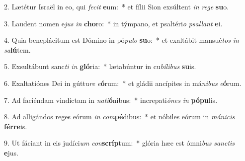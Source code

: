 2. Lætétur Israël in eo, qui \textit{fe}\textit{cit} \textbf{e}um:~*  et fílii Sion exsúltent \textit{in} \textit{re}\textit{ge} \textbf{su}o.\

3. Laudent nomen e\textit{jus} \textit{in} \textbf{cho}ro:~*  in týmpano, et psaltéri\textit{o} \textit{psal}\textit{lant} \textbf{e}i.\

4. Quia beneplácitum est Dómino in pó\textit{pu}\textit{lo} \textbf{su}o:~*  et exaltábit mansué\textit{tos} \textit{in} \textit{sa}\textbf{lú}tem.\

5. Exsultábunt sanc\textit{ti} \textit{in} \textbf{gló}ria:~*  lætabúntur in cu\textit{bí}\textit{li}\textit{bus} \textbf{su}is.\

6. Exaltatiónes Dei in gúttu\textit{re} \textit{e}\textbf{ó}rum:~*  et gládii ancípites in má\textit{ni}\textit{bus} \textit{e}\textbf{ó}rum.\

7. Ad faciéndam vindíctam in \textit{na}\textit{ti}\textbf{ó}nibus:~*  increpati\textit{ó}\textit{nes} \textit{in} \textbf{pó}\textbf{pu}lis.\

8. Ad alligándos reges eórum \textit{in} \textit{com}\textbf{pé}dibus:~*  et nóbiles eórum in \textit{má}\textit{ni}\textit{cis} \textbf{fér}\textbf{re}is.\

9. Ut fáciant in eis judíci\textit{um} \textit{con}\textbf{scríp}tum:~*  glória hæc est ómni\textit{bus} \textit{sanc}\textit{tis} \textbf{e}jus.\

